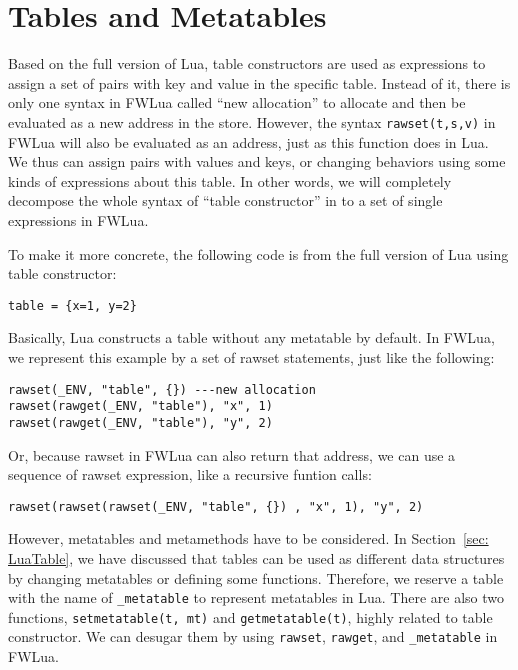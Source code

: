 \section{Tables and Metatables}\label{sec:TranslateTabls}
Based on the full version of Lua, table constructors are used as expressions to assign a set of pairs with key and value in the specific table. Instead of it, there is only one syntax in FWLua called ``new allocation'' to allocate and then be evaluated as a new address in the store. 
However, the syntax {\tt rawset(t,s,v)} in FWLua will also be evaluated as an address, just as this function does in Lua.  We thus can assign pairs with values and keys, or changing behaviors using some kinds of expressions about this table. In other words, we will completely decompose the whole syntax of ``table constructor'' in to a set of single expressions in FWLua. 

To make it more concrete, the following code is from the full version of Lua using table constructor:

\begin{verbatim}
table = {x=1, y=2}
\end{verbatim}

Basically, Lua constructs a table without any metatable by default. In FWLua, we represent this example by a set of rawset statements, just like the following:

\begin{verbatim}
rawset(_ENV, "table", {}) ---new allocation
rawset(rawget(_ENV, "table"), "x", 1)
rawset(rawget(_ENV, "table"), "y", 2)
\end{verbatim}

Or, because rawset in FWLua can also return that address, we can use a sequence of rawset expression, like a recursive funtion calls:

\begin{verbatim}
rawset(rawset(rawset(_ENV, "table", {}) , "x", 1), "y", 2)
\end{verbatim}

However, metatables and metamethods have to be considered. In Section~\ref{sec: LuaTable}, we have discussed that tables can be used as different data structures by changing metatables or defining some functions. Therefore, we reserve a table with the name of {\tt \_metatable} to represent metatables in Lua. There are also two functions, {\tt setmetatable(t, mt)} and {\tt getmetatable(t)}, highly related to table constructor. We can desugar them by using {\tt rawset}, {\tt rawget}, and {\tt \_metatable} in FWLua.

